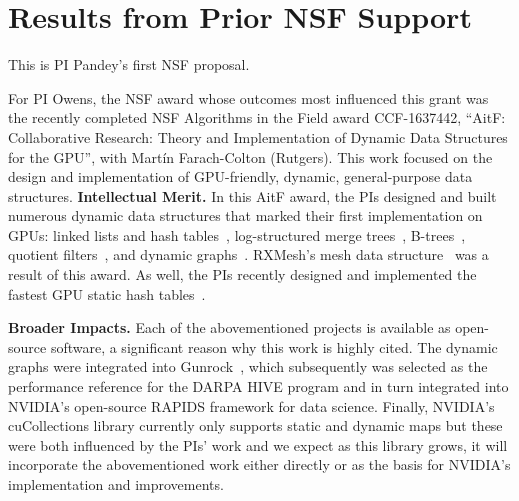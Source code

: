 \section{Results from Prior NSF Support}

This is PI Pandey's first NSF proposal.


For PI Owens, the NSF award whose outcomes most influenced this grant was the recently completed NSF Algorithms in the Field award CCF-1637442, ``AitF: Collaborative Research: Theory and Implementation of Dynamic Data Structures for the GPU'', with Mart\'{i}n Farach-Colton (Rutgers). This work focused on the design and implementation of GPU-friendly, dynamic, general-purpose data structures.
\textbf{Intellectual Merit.} In this AitF award, the PIs designed and built numerous dynamic data structures that marked their first implementation on GPUs: linked lists and hash tables~\cite{Ashkiani:2018:ADH}, log-structured merge trees~\cite{Ashkiani:2018:GLA}, B-trees~\cite{Awad:2019:EAH}, quotient filters~\cite{Geil:2018:QFA}, and dynamic graphs~\cite{Awad:2020:DGO}. RXMesh's mesh data structure~\cite{Mahmoud:2021:RAG} was a result of this award. As well, the PIs recently designed and implemented the fastest GPU static hash tables~\cite{Awad:2023:AAI}.

\textbf{Broader Impacts.} Each of the abovementioned projects is available as open-source software, a significant reason why this work is highly cited. The dynamic graphs were integrated into Gunrock~\cite{Awad:2020:DGO,Wang:2017:GGG}, which subsequently was selected as the performance reference for the DARPA HIVE program and in turn integrated into NVIDIA's open-source RAPIDS framework for data science. Finally, NVIDIA's cuCollections library currently only supports static and dynamic maps but these were both influenced by the PIs' work and we expect as this library grows, it will incorporate the abovementioned work either directly or as the basis for NVIDIA's implementation and improvements.

